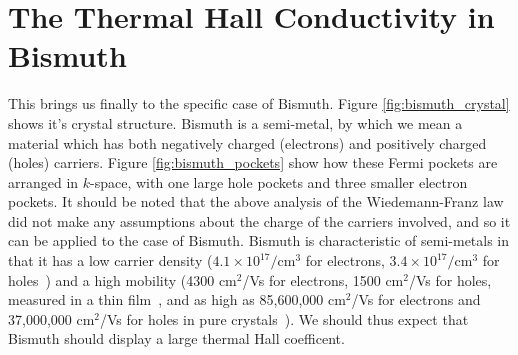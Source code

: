 \documentclass{thesis-umich}
\begin{document}
\section{The Thermal Hall Conductivity in Bismuth}

This brings us finally to the specific case of Bismuth. Figure
\ref{fig:bismuth_crystal} shows it's crystal structure. Bismuth is a
semi-metal, by which we mean a material which has both negatively charged
(electrons) and positively charged (holes) carriers. Figure \ref{fig:bismuth_pockets} show how these Fermi pockets are arranged in $k$-space, with one large hole pockets and three smaller electron pockets. It should be noted that
the above analysis of the Wiedemann-Franz law did not make any assumptions
about the charge of the carriers involved, and so it can be applied to the case
of Bismuth. Bismuth is characteristic of semi-metals in that it has a low
carrier density ($4.1 \times 10^{17} /$cm$^3$ for electrons, $3.4 \times
10^{17} /$cm$^3$ for holes~\cite{Jain1962}) and a high mobility (4300 cm$^2$/Vs
for electrons, 1500 cm$^2$/Vs for holes, measured in a thin
film~\cite{Rosenbaum2004}, and as high as 85,600,000 cm$^2$/Vs for electrons
and 37,000,000 cm$^2$/Vs for holes in pure crystals~\cite{Gallo1963}). We
should thus expect that Bismuth should display a large thermal Hall coefficent.
\end{document}
